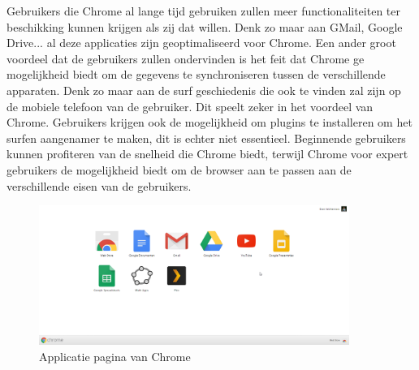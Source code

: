 \documentclass[11pt]{article}
\begin{document}
\newline
Gebruikers die Chrome al lange tijd gebruiken zullen meer functionaliteiten ter beschikking kunnen krijgen als zij dat willen. Denk zo maar aan GMail, Google Drive... al deze applicaties zijn geoptimaliseerd voor Chrome. Een ander groot voordeel dat de gebruikers zullen ondervinden is het feit dat Chrome ge mogelijkheid biedt om de gegevens te synchroniseren tussen de verschillende apparaten. Denk zo maar aan de surf geschiedenis die ook te vinden zal zijn op de mobiele telefoon van de gebruiker. Dit speelt zeker in het voordeel van Chrome. Gebruikers krijgen ook de mogelijkheid om plugins te installeren om het surfen aangenamer te maken, dit is echter niet essentieel. Beginnende gebruikers kunnen profiteren van de snelheid die Chrome biedt, terwijl Chrome voor expert gebruikers de mogelijkheid biedt om de browser aan te passen aan de verschillende eisen van de gebruikers.
\begin{figure}
  \centering
    \includegraphics[width=0.9\textwidth]{apps.png}
  \caption{Applicatie pagina van Chrome}
  \label{fig:apps}
\end{figure}
\newpage
\end{document}
